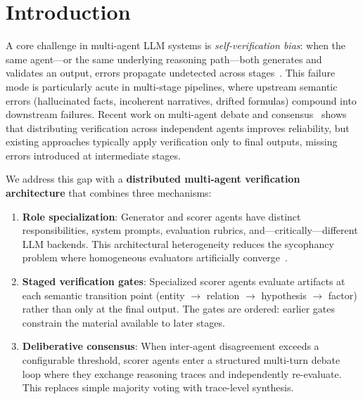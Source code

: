 \documentclass[sigconf]{acmart}
\begin{document}

\maketitle

\section{Introduction}

A core challenge in multi-agent LLM systems is \textit{self-verification bias}: when the same agent---or the same underlying reasoning path---both generates and validates an output, errors propagate undetected across stages~\cite{ghafarollahi2024sciagents,wang2025masllm}. This failure mode is particularly acute in multi-stage pipelines, where upstream semantic errors (hallucinated facts, incoherent narratives, drifted formulas) compound into downstream failures. Recent work on multi-agent debate and consensus~\cite{mao2025blueprint2code} shows that distributing verification across independent agents improves reliability, but existing approaches typically apply verification only to final outputs, missing errors introduced at intermediate stages.

We address this gap with a \textbf{distributed multi-agent verification architecture} that combines three mechanisms:
\begin{enumerate}
    \item \textbf{Role specialization}: Generator and scorer agents have distinct responsibilities, system prompts, evaluation rubrics, and---critically---different LLM backends. This architectural heterogeneity reduces the sycophancy problem where homogeneous evaluators artificially converge~\cite{ghafarollahi2024sciagents}.
    \item \textbf{Staged verification gates}: Specialized scorer agents evaluate artifacts at each semantic transition point (entity $\rightarrow$ relation $\rightarrow$ hypothesis $\rightarrow$ factor) rather than only at the final output. The gates are ordered: earlier gates constrain the material available to later stages.
    \item \textbf{Deliberative consensus}: When inter-agent disagreement exceeds a configurable threshold, scorer agents enter a structured multi-turn debate loop where they exchange reasoning traces and independently re-evaluate. This replaces simple majority voting with trace-level synthesis.
\end{enumerate}
\end{document}

